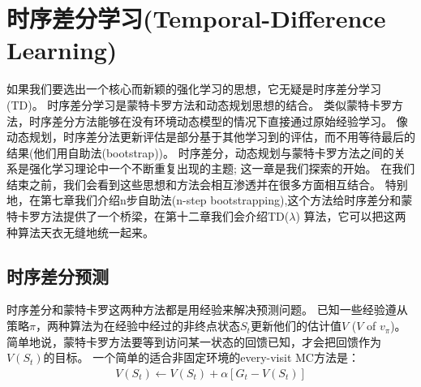 \documentclass{book}
\begin{document}


\chapter{时序差分学习(Temporal-Difference Learning)}
如果我们要选出一个核心而新颖的强化学习的思想，它无疑是时序差分学习(TD)。
时序差分学习是蒙特卡罗方法和动态规划思想的结合。
类似蒙特卡罗方法，时序差分方法能够在没有环境动态模型的情况下直接通过原始经验学习。
像动态规划，时序差分法更新评估是部分基于其他学习到的评估，而不用等待最后的结果(他们用自助法(bootstrap))。
时序差分，动态规划与蒙特卡罗方法之间的关系是强化学习理论中一个不断重复出现的主题; 这一章是我们探索的开始。
在我们结束之前，我们会看到这些思想和方法会相互渗透并在很多方面相互结合。
特别地，在第七章我们介绍n步自助法(n-step bootstrapping),这个方法给时序差分和蒙特卡罗方法提供了一个桥梁，在第十二章我们会介绍TD($\lambda$) 算法，它可以把这两种算法天衣无缝地统一起来。

\section{时序差分预测}
时序差分和蒙特卡罗这两种方法都是用经验来解决预测问题。
已知一些经验遵从策略$\pi$，两种算法为在经验中经过的非终点状态$S_t$更新他们的估计值$V$ ($V$ of $v_\pi$)。
简单地说，蒙特卡罗方法要等到访问某一状态的回馈已知，才会把回馈作为$V(S_t)$的目标。
一个简单的适合非固定环境的every-visit MC方法是：
\begin{align}
	V(S_t) \leftarrow V(S_t) + \alpha[G_t - V(S_t)]
\end{align}
\end{document}
